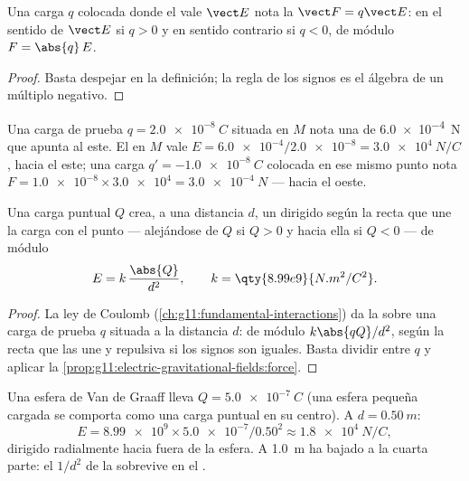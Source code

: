 \begin{proposition}\label{prop:g11:electric-gravitational-fields:force}
Una carga $q$ colocada donde el  vale $\vect E$ nota la 
$\vect F = q \vect E$: en el sentido de $\vect E$ si $q > 0$ y en
sentido contrario si $q < 0$, de módulo $F = \abs{q}\,E$.
\end{proposition}

\begin{proof}
Basta despejar en la definición; la regla de los signos es el álgebra de
un múltiplo negativo.
\end{proof}

\begin{example}\label{ex:g11:electric-gravitational-fields:reading}
Una carga de prueba $q = \qty{+2.0e-8}{C}$ situada en $M$ nota una
 de \qty{6.0e-4}{N} que apunta al este. El  en $M$ vale
$E = \num{6.0e-4} / \num{2.0e-8} = \qty{3.0e4}{N/C}$, hacia el este; una
carga $q' = \qty{-1.0e-8}{C}$ colocada en ese mismo punto nota
$F = \num{1.0e-8} \times \num{3.0e4} = \qty{3.0e-4}{N}$ --- hacia el
oeste.
\end{example}

\begin{proposition}\label{prop:g11:electric-gravitational-fields:point}
Una carga puntual $Q$ crea, a una distancia $d$, un  dirigido según
la recta que une la carga con el punto --- alejándose de $Q$ si $Q > 0$
y hacia ella si $Q < 0$ --- de módulo
\[
E = k\,\frac{\abs{Q}}{d^2},
\qquad k = \qty{8.99e9}{N.m^2/C^2}.
\]
\end{proposition}

\begin{proof}
La ley de Coulomb (\cref{ch:g11:fundamental-interactions}) da la 
sobre una carga de prueba $q$ situada a la distancia $d$: de módulo
$k \abs{qQ} / d^2$, según la recta que las une y repulsiva si los signos
son iguales. Basta dividir entre $q$ y aplicar la
\cref{prop:g11:electric-gravitational-fields:force}.
\end{proof}

\begin{example}\label{ex:g11:electric-gravitational-fields:sphere}
Una esfera de Van de Graaff lleva $Q = \qty{+5.0e-7}{C}$ (una esfera
pequeña cargada se comporta como una carga puntual en su centro). A
$d = \qty{0.50}{m}$:
\[
E = \num{8.99e9} \times \num{5.0e-7} / 0.50^2 \approx \qty{1.8e4}{N/C},
\]
dirigido radialmente hacia fuera de la esfera. A \qty{1.0}{m} ha bajado
a la cuarta parte: el $1/d^2$ de la  sobrevive en el .
\end{example}


